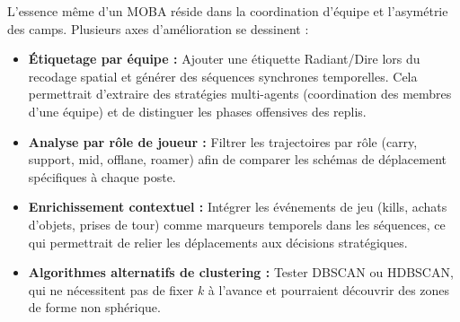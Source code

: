 \documentclass[11pt, a4paper]{article}
\begin{document}
L'essence même d'un MOBA réside dans la coordination d'équipe et l'asymétrie des camps. Plusieurs axes d'amélioration se dessinent :
\begin{itemize}
    \item \textbf{Étiquetage par équipe :} Ajouter une étiquette Radiant/Dire lors du recodage spatial et générer des séquences synchrones temporelles. Cela permettrait d'extraire des stratégies multi-agents (coordination des membres d'une équipe) et de distinguer les phases offensives des replis.
    \item \textbf{Analyse par rôle de joueur :} Filtrer les trajectoires par rôle (carry, support, mid, offlane, roamer) afin de comparer les schémas de déplacement spécifiques à chaque poste.
    \item \textbf{Enrichissement contextuel :} Intégrer les événements de jeu (kills, achats d'objets, prises de tour) comme marqueurs temporels dans les séquences, ce qui permettrait de relier les déplacements aux décisions stratégiques.
    \item \textbf{Algorithmes alternatifs de clustering :} Tester DBSCAN ou HDBSCAN, qui ne nécessitent pas de fixer $k$ à l'avance et pourraient découvrir des zones de forme non sphérique.
\end{itemize}
\end{document}
